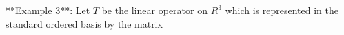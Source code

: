 
**Example 3**: Let \(T\) be the linear operator on \(R^{3}\) which is represented in the standard ordered basis by the matrix 